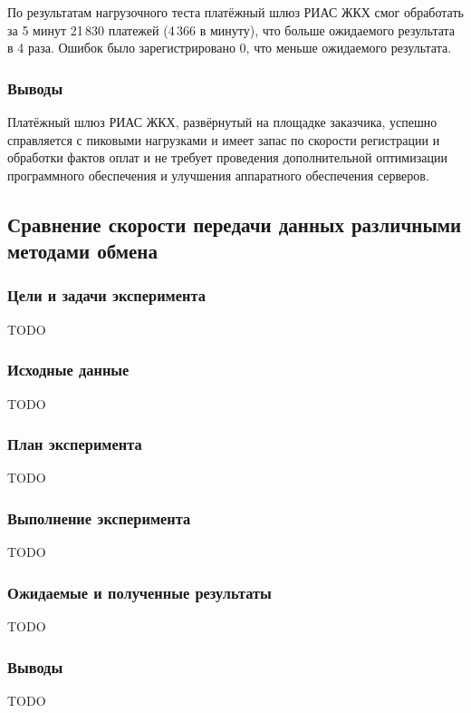 По результатам нагрузочного теста платёжный шлюз РИАС ЖКХ смог обработать за 5 минут 21\,830 платежей (4\,366 в минуту), что больше ожидаемого результата в 4 раза.
Ошибок было зарегистрировано 0, что меньше ожидаемого результата.

\subsubsection*{Выводы}

Платёжный шлюз РИАС ЖКХ, развёрнутый на площадке заказчика, успешно справляется с пиковыми нагрузками и имеет запас по скорости регистрации и обработки фактов оплат и не требует проведения дополнительной оптимизации программного обеспечения и улучшения аппаратного обеспечения серверов.

\subsection{Сравнение скорости передачи данных различными методами обмена}

\subsubsection*{Цели и задачи эксперимента}

TODO

\subsubsection*{Исходные данные}

TODO

\subsubsection*{План эксперимента}

TODO

\subsubsection*{Выполнение эксперимента}

TODO

\subsubsection*{Ожидаемые и полученные результаты}

TODO

\subsubsection*{Выводы}

TODO

\clearpage
\newpage